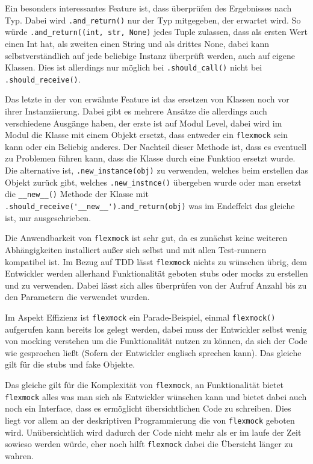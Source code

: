 Ein besonders interessantes Feature ist, dass überprüfen des Ergebnisses nach Typ. Dabei
wird \lstinline{.and_return()} nur der Typ mitgegeben, der erwartet wird. So würde
\lstinline{.and_return((int, str, None)} jedes Tuple zulassen, dass als ersten Wert einen
Int hat, als zweiten einen String und als drittes None, dabei kann selbstverständlich auf
jede beliebige Instanz überprüft werden, auch auf eigene Klassen. Dies ist allerdings nur
möglich bei \lstinline{.should_call()} nicht bei \lstinline{.should_receive()}.

Das letzte in der von \cite{felxmock:docs:0.10.3} erwähnte Feature ist das ersetzen von
Klassen noch vor ihrer Instanziierung. Dabei gibt es mehrere Ansätze die allerdings auch
verschiedene Ausgänge haben, der erste ist auf Modul Level, dabei wird im Modul die Klasse
mit einem Objekt ersetzt, dass entweder ein \lstinline{flexmock} sein kann oder ein Beliebig
anderes. Der Nachteil dieser Methode ist, dass es eventuell zu Problemen führen kann, dass
die Klasse durch eine Funktion ersetzt wurde. Die alternative ist, \lstinline{.new_instance(obj)}
zu verwenden, welches beim erstellen das Objekt zurück gibt, welches \lstinline{.new_instnce()}
übergeben wurde oder man ersetzt die \lstinline{__new__()} Methode der Klasse mit
\lstinline{.should_receive('__new__').and_return(obj)} was im Endeffekt das gleiche ist, nur
ausgeschrieben.

Die Anwendbarkeit von \lstinline{flexmock} ist sehr gut, da es zunächst keine
weiteren Abhängigkeiten installiert außer sich selbst und mit allen Test-runnern
kompatibel ist. Im Bezug auf TDD lässt \lstinline{flexmock} nichts zu wünschen übrig,
dem Entwickler werden allerhand Funktionalität geboten \Glspl{stub} oder \Glspl{mock} zu
erstellen und zu verwenden. Dabei lässt sich alles überprüfen von der Aufruf Anzahl bis zu
den Parametern die verwendet wurden.

Im Aspekt Effizienz ist \lstinline{flexmock} ein Parade-Beispiel, einmal \lstinline{flexmock()}
aufgerufen kann bereits los gelegt werden, dabei muss der Entwickler selbst wenig von
\gls{mock}ing verstehen um die Funktionalität nutzen zu können, da sich der Code wie gesprochen
ließt (Sofern der Entwickler englisch sprechen kann). Das gleiche gilt für die \Glspl{stub} und
fake Objekte.

Das gleiche gilt für die Komplexität von \lstinline{flexmock}, an Funktionalität bietet
\lstinline{flexmock} alles was man sich als Entwickler wünschen kann und bietet dabei auch
noch ein Interface, dass es ermöglicht übersichtlichen Code zu schreiben. Dies liegt vor allem
an der deskriptiven Programmierung die von \lstinline{flexmock} geboten wird. Unübersichtlich
wird dadurch der Code nicht mehr als er im laufe der Zeit sowieso werden würde, eher noch hilft
\lstinline{flexmock} dabei die Übersicht länger zu wahren.

